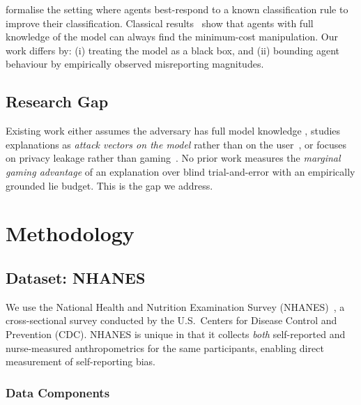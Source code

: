 \documentclass[12pt, a4paper, oneside]{report}
\theoremstyle{definition}
\begin{document}
\citet{ghalme2021strategic} formalise the setting where agents best-respond
to a known classification rule to improve their classification. Classical
results~\citep{hardt2016strategic} show that agents with full knowledge of
the model can always find the minimum-cost manipulation. Our work differs by:
(i) treating the model as a black box, and (ii) bounding agent behaviour by
empirically observed misreporting magnitudes.


\section{Research Gap}

Existing work either assumes the adversary has full model knowledge
\citep{ghalme2021strategic}, studies explanations as \textit{attack vectors
on the model} rather than on the user~\citep{slack2020fooling}, or focuses
on privacy leakage rather than gaming~\citep{shokri2021privacy}. No prior
work measures the \textit{marginal gaming advantage} of an explanation over
blind trial-and-error with an empirically grounded lie budget. This is
the gap we address.

\chapter{Methodology}
\label{chap:methodology}


\section{Dataset: NHANES}

We use the National Health and Nutrition Examination Survey
(NHANES)~\citep{johnson2014national}, a cross-sectional survey conducted
by the U.S.\ Centers for Disease Control and Prevention (CDC).
NHANES is unique in that it collects \textit{both} self-reported and
nurse-measured anthropometrics for the same participants, enabling direct
measurement of self-reporting bias.

\subsection{Data Components}
\end{document}

